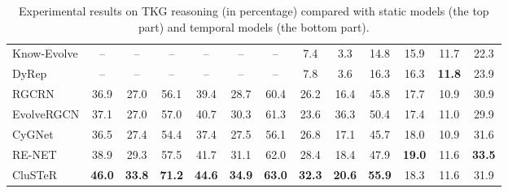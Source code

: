 \documentclass[11pt,a4paper]{article}
\begin{document}
\begin{table*}[htb]
\begin{tabular}{lcccccccccccc}
\midrule
\scriptsize{Know-Evolve}\!\!\!  &-- &-- &--    &-- &-- &-- &7.4 &3.3 &14.8 &15.9 &11.7  &22.3 \\
\scriptsize{DyRep}\!\!\!     &-- &-- &--  &-- &-- &-- &7.8 &3.6 &16.3 &16.3 &\textbf{11.8} &23.9\\
\scriptsize{RGCRN}\!\!\!     &36.9    &27.0    &56.1    &39.4    &28.7    &60.4    &26.2    &16.4    &45.8    &17.7    &10.9    &30.9\\
\scriptsize{EvolveRGCN}\!\!\!    &37.1    &27.0    &57.0    &40.7  &30.3
&61.3    &23.6    &36.3    &50.4    &17.4 &11.0 &29.9\\
\scriptsize{CyGNet}\!\!\!  &36.5  &27.4  & 54.4  &37.4  &27.5  &56.1 &26.8  &17.1  &45.7   &18.0  &10.9   &31.6\\
\scriptsize{RE-NET}\!\!\!  &38.9  &29.3  &57.5   &41.7  &31.1  &62.0 &28.4  &18.4  &47.9   &\textbf{19.0}  & 11.6  &\textbf{33.5}\\
\scriptsize{CluSTeR}\!\!\! &\textbf{46.0}  &\textbf{33.8}  &\textbf{71.2}   &
\textbf{44.6}  & \textbf{34.9}  & \textbf{63.0}  & \textbf{32.3}  &
\textbf{20.6}   & \textbf{55.9} & 18.3  & 11.6   & 31.9\\
\bottomrule
\end{tabular}
\vspace{-2mm}
\caption{Experimental results on TKG reasoning (in percentage) compared with static models (the top part) and temporal models (the bottom part).}
\vspace{-2mm}
\label{table:results}
\end{table*}
\end{document}
